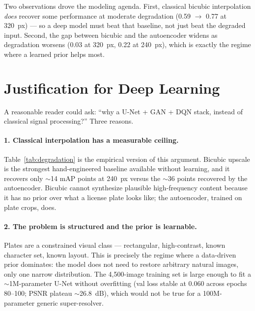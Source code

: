 \documentclass[11pt]{article}
\begin{document}
Two observations drove the modeling agenda. First, classical bicubic
interpolation \emph{does} recover some performance at moderate degradation
(0.59 $\to$ 0.77 at 320~px) --- so a deep model must beat that baseline, not
just beat the degraded input. Second, the gap between bicubic and the
autoencoder widens as degradation worsens (0.03 at 320~px, 0.22 at 240~px),
which is exactly the regime where a learned prior helps most.

\section{Justification for Deep Learning}

A reasonable reader could ask: ``why a U-Net + GAN + DQN stack, instead of
classical signal processing?'' Three reasons.

\paragraph{1. Classical interpolation has a measurable ceiling.}
Table~\ref{tab:degradation} is the empirical version of this argument.
Bicubic upscale is the strongest hand-engineered baseline available
without learning, and it recovers only $\sim$14 mAP points at 240~px versus
the $\sim$36 points recovered by the autoencoder. Bicubic cannot synthesize
plausible high-frequency content because it has no prior over what a license
plate looks like; the autoencoder, trained on plate crops, does.

\paragraph{2. The problem is structured and the prior is learnable.}
Plates are a constrained visual class --- rectangular, high-contrast,
known character set, known layout. This is precisely the regime where a
data-driven prior dominates: the model does not need to restore arbitrary
natural images, only one narrow distribution. The 4{,}500-image training set
is large enough to fit a $\sim$1M-parameter U-Net without overfitting (val
loss stable at 0.060 across epochs 80--100; PSNR plateau $\sim$26.8~dB),
which would not be true for a 100M-parameter generic super-resolver.
\end{document}
